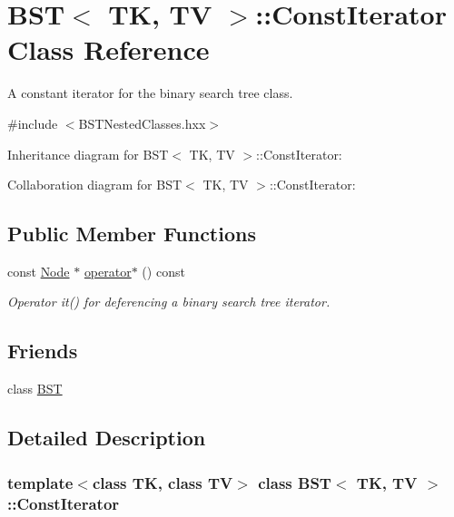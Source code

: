 \hypertarget{classBST_1_1ConstIterator}{}\section{B\+ST$<$ TK, TV $>$\+:\+:Const\+Iterator Class Reference}
\label{classBST_1_1ConstIterator}


A constant iterator for the binary search tree class.  




{\ttfamily \#include $<$B\+S\+T\+Nested\+Classes.\+hxx$>$}



Inheritance diagram for B\+ST$<$ TK, TV $>$\+:\+:Const\+Iterator\+:


Collaboration diagram for B\+ST$<$ TK, TV $>$\+:\+:Const\+Iterator\+:
\subsection*{Public Member Functions}
\begin{DoxyCompactItemize}
\item 
const \hyperlink{structBST_1_1Node}{Node} $\ast$ \hyperlink{classBST_1_1ConstIterator_ade0e6b8a4bbab47081c31a2a6d8c1b8c}{operator$\ast$} () const
\begin{DoxyCompactList}\small\item\em Operator it() for deferencing a binary search tree iterator. \end{DoxyCompactList}\end{DoxyCompactItemize}
\subsection*{Friends}
\begin{DoxyCompactItemize}
\item 
class \hyperlink{classBST_1_1ConstIterator_abf74961fd25e946e53e07f358b4bb19a}{B\+ST}
\end{DoxyCompactItemize}


\subsection{Detailed Description}
\subsubsection*{template$<$class TK, class TV$>$\newline
class B\+S\+T$<$ T\+K, T\+V $>$\+::\+Const\+Iterator}

